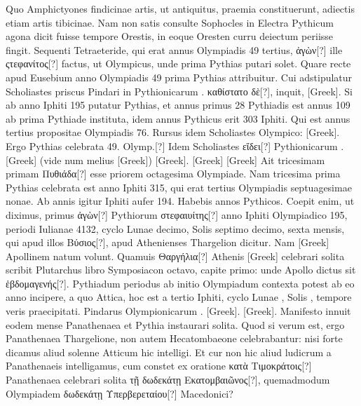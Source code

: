 Quo Amphictyones findicinae artis, ut
antiquitus, praemia constituerunt, adiectis etiam artis tibicinae.
Nam non satis consulte Sophocles in Electra Pythicum agona dicit fuisse
tempore Orestis, in eoque Oresten curru deiectum periisse fingit.
Sequenti
Tetraeteride, qui erat annus Olympiadis 49 tertius, \textgreek{ἀγὼν[?]}
 ille \textgreek{ςτεφανίτος[?]}
factus, ut Olympicus, unde prima Pythias putari solet.
Quare recte
apud Eusebium anno  Olympiadis 49 prima Pythias attribuitur.
Cui adstipulatur Scholiastes priscus Pindari in Pythionicarum
. \textgreek{καθίστατο δὲ[?]}, inquit,
 \textgreek{[Greek]}.
Si ab anno Iphiti 195 putatur Pythias, et annus primus 28
Pythiadis est annus 109 ab prima Pythiade instituta, idem annus Pythicus
erit 303 Iphiti.
Qui est annus tertius propositae Olympiadis 76.
Rursus idem Scholiastes  Olympico: \textgreek{[Greek]}.
Ergo Pythias celebrata 49. Olymp.[?]
Idem
Scholiastes \textgreek{εἴδει[?]} Pythionicarum .
\textgreek{[Greek]}
(vide num melius \textgreek{[Greek]})
\textgreek{[Greek]}.
\textgreek{[Greek]}
\textgreek{[Greek]}
Ait tricesimam primam \textgreek{Πυθιάδα[?]} esse priorem
octagesima Olympiade.
Nam tricesima prima Pythias celebrata
est anno Iphiti 315, qui erat tertius Olympiadis septuagesimae nonae.
Ab annis igitur Iphiti aufer 194.
Habebis annos Pythicos.
Coepit
enim, ut diximus, primus \textgreek{ἀγὼν[?]} Pythiorum
 \textgreek{στεφαιυίτης[?]} anno Iphiti Olympiadico
195, periodi Iulianae 4132, cyclo Lunae decimo, Solis septimo
decimo, sexta mensis, qui apud illos \textgreek{Βύσιος[?]}, apud Athenienses
Thargelion dicitur.
Nam \textgreek{[Greek]} Apollinem natum volunt.
Quamuis \textgreek{Θαργήλια[?]} Athenis
 \textgreek{[Greek]} celebrari solita
scribit Plutarchus libro Symposiacon octavo, capite primo: unde
Apollo dictus sit \textgreek{ἑβδομαγενής[?]}.
Pythiadum periodus ab initio Olympiadum
contexta potest ab eo anno incipere, a quo Attica, hoc est a
tertio Iphiti, cyclo Lunae ,
 Solis , tempore veris praecipitati.
Pindarus Olympionicarum .
\textgreek{[Greek]}.
\textgreek{[Greek]}.
Manifesto innuit eodem
mense Panathenaea et Pythia instaurari solita.
Quod si verum
est, ergo Panathenaea Thargelione, non autem Hecatombaeone celebrabantur:
nisi forte dicamus aliud solenne Atticum hic intelligi.
Et cur non hic aliud ludicrum a Panathenaeis intelligamus, cum constet
ex oratione \textgreek{κατὰ Τιμοκράτοις[?]} Panathenaea celebrari solita
 \textgreek{τῇ δωδεκάτῃ
Εκατομβαιῶνος[?]},
quemadmodum Olympiadem \textgreek{δωδεκάτῃ Υπερβερεταίου[?]} Macedonici?

